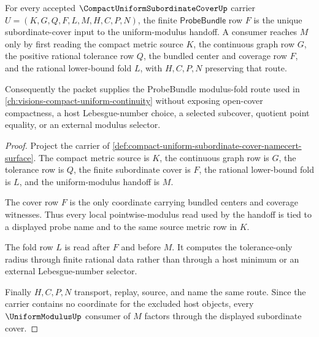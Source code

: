 \begin{theorem}
\label{thm:compact-uniform-subordinate-cover-handoff}
For every accepted $\CompactUniformSubordinateCoverUp$ carrier $U=(K,G,Q,F,L,M,H,C,P,N)$, the finite $\mathsf{ProbeBundle}$ row $F$ is the unique subordinate-cover input to the uniform-modulus handoff. A consumer reaches $M$ only by first reading the compact metric source $K$, the continuous graph row $G$, the positive rational tolerance row $Q$, the bundled center and coverage row $F$, and the rational lower-bound fold $L$, with $H,C,P,N$ preserving that route.

Consequently the packet supplies the ProbeBundle modulus-fold route used in \autoref{ch:visions-compact-uniform-continuity} without exposing open-cover compactness, a host Lebesgue-number choice, a selected subcover, quotient point equality, or an external modulus selector.
\end{theorem}
\begin{proof}
Project the carrier of \autoref{def:compact-uniform-subordinate-cover-namecert-surface}. The compact metric source is $K$, the continuous graph row is $G$, the tolerance row is $Q$, the finite subordinate cover is $F$, the rational lower-bound fold is $L$, and the uniform-modulus handoff is $M$.

The cover row $F$ is the only coordinate carrying bundled centers and coverage witnesses. Thus every local pointwise-modulus read used by the handoff is tied to a displayed probe name and to the same source metric row in $K$.

The fold row $L$ is read after $F$ and before $M$. It computes the tolerance-only radius through finite rational data rather than through a host minimum or an external Lebesgue-number selector.

Finally $H,C,P,N$ transport, replay, source, and name the same route. Since the carrier contains no coordinate for the excluded host objects, every $\UniformModulusUp$ consumer of $M$ factors through the displayed subordinate cover.
\end{proof}


